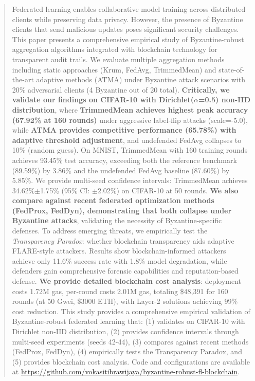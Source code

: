 \documentclass{ieeeaccess}
\begin{document}
\begin{abstract}
Federated learning enables collaborative model training across distributed clients while preserving data privacy. However, the presence of Byzantine clients that send malicious updates poses significant security challenges. This paper presents a comprehensive empirical study of Byzantine-robust aggregation algorithms integrated with blockchain technology for transparent audit trails. We evaluate multiple aggregation methods including static approaches (Krum, FedAvg, TrimmedMean) and state-of-the-art adaptive methods (ATMA) under Byzantine attack scenarios with 20\% adversarial clients (4 Byzantine out of 20 total). \textbf{Critically, we validate our findings on CIFAR-10 with Dirichlet($\alpha$=0.5) non-IID distribution}, where \textbf{TrimmedMean achieves highest peak accuracy (67.92\% at 160 rounds)} under aggressive label-flip attacks (scale=-5.0), while \textbf{ATMA provides competitive performance (65.78\%) with adaptive threshold adjustment}, and undefended FedAvg collapses to 10\% (random guess). On MNIST, TrimmedMean with 160 training rounds achieves 93.45\% test accuracy, exceeding both the reference benchmark (89.59\%) by 3.86\% and the undefended FedAvg baseline (87.60\%) by 5.85\%. We provide multi-seed confidence intervals: TrimmedMean achieves 34.62\%$\pm$1.75\% (95\% CI: $\pm$2.02\%) on CIFAR-10 at 50 rounds. \textbf{We also compare against recent federated optimization methods (FedProx, FedDyn), demonstrating that both collapse under Byzantine attacks}, validating the necessity of Byzantine-specific defenses. To address emerging threats, we empirically test the \emph{Transparency Paradox}: whether blockchain transparency aids adaptive FLARE-style attackers. Results show blockchain-informed attackers achieve only 11.6\% success rate with 1.8\% model degradation, while defenders gain comprehensive forensic capabilities and reputation-based defense. \textbf{We provide detailed blockchain cost analysis}: deployment costs 1.72M gas, per-round costs 2.01M gas, totaling \$48,391 for 160 rounds (at 50 Gwei, \$3000 ETH), with Layer-2 solutions achieving 99\% cost reduction. This study provides a comprehensive empirical validation of Byzantine-robust federated learning that: (1) validates on CIFAR-10 with Dirichlet non-IID distribution, (2) provides confidence intervals through multi-seed experiments (seeds 42-44), (3) compares against recent methods (FedProx, FedDyn), (4) empirically tests the Transparency Paradox, and (5) provides blockchain cost analysis. Code and configurations are available at \url{https://github.com/vokasitibrawijaya/byzantine-robust-fl-blockchain}.
\end{abstract}
\end{document}
